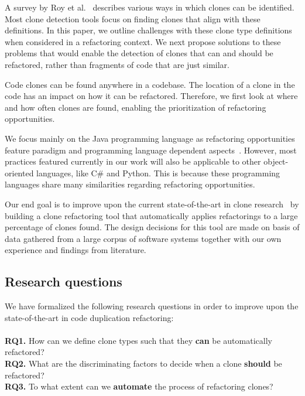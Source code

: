 \documentclass[a4paper]{article}
\begin{document}
A survey by Roy et al.~\cite{roy2007survey} describes various ways in which clones can be identified. Most clone detection tools focus on finding clones that align with these definitions. In this paper, we outline challenges with these clone type definitions when considered in a refactoring context. We next propose solutions to these problems that would enable the detection of clones that can and should be refactored, rather than fragments of code that are just similar.

Code clones can be found anywhere in a codebase. The location of a clone in the code has an impact on how it can be refactored. Therefore, we first look at where and how often clones are found, enabling the prioritization of refactoring opportunities.

We focus mainly on the Java programming language as refactoring opportunities feature paradigm and programming language dependent aspects~\cite{choi2011extracting}. However, most practices featured currently in our work will also be applicable to other object-oriented languages, like C\# and Python. This is because these programming languages share many similarities regarding refactoring opportunities.

Our end goal is to improve upon the current state-of-the-art in clone research~\cite{fontana2015duplicated, alwaqfi2017refactoring} by building a clone refactoring tool that automatically applies refactorings to a large percentage of clones found. The design decisions for this tool are made on basis of data gathered from a large corpus of software systems together with our own experience and findings from literature.

\subsection{Research questions}
We have formalized the following research questions in order to improve upon the state-of-the-art in code duplication refactoring:
\\\\
\textbf{RQ1.} How can we define clone types such that they \textbf{can} be automatically refactored?\\
\textbf{RQ2.} What are the discriminating factors to decide when a clone \textbf{should} be refactored?\\
\textbf{RQ3.} To what extent can we \textbf{automate} the process of refactoring clones?\\
\end{document}
